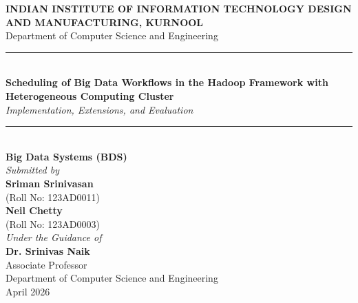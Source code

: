 \documentclass[12pt,a4paper]{article}
\begin{document}
\begin{titlepage}
\begin{center}

\vspace*{0.5cm}
{\Large \textbf{INDIAN INSTITUTE OF INFORMATION TECHNOLOGY DESIGN AND MANUFACTURING, KURNOOL}}\\[0.3cm]
{\large Department of Computer Science and Engineering}\\[1.5cm]

\rule{\linewidth}{0.8mm}\\[0.4cm]
{\LARGE \bfseries Scheduling of Big Data Workflows in the Hadoop Framework with Heterogeneous Computing Cluster}\\[0.3cm]
{\large \textit{Implementation, Extensions, and Evaluation}}\\[0.2cm]
\rule{\linewidth}{0.8mm}\\[1.5cm]

{\Large \textbf{Big Data Systems (BDS)}}\\[1.5cm]

\textit{Submitted by}\\[0.4cm]
{\Large \textbf{Sriman Srinivasan}}\\
(Roll No: 123AD0011)\\[0.3cm]
{\Large \textbf{Neil Chetty}}\\
(Roll No: 123AD0003)\\[0.3cm]

\textit{Under the Guidance of}\\[0.3cm]
{\large \textbf{Dr. Srinivas Naik}}\\
Associate Professor\\
Department of Computer Science and Engineering\\[0.3cm]

{\large April 2026}

\end{center}
\end{titlepage}
\end{document}
